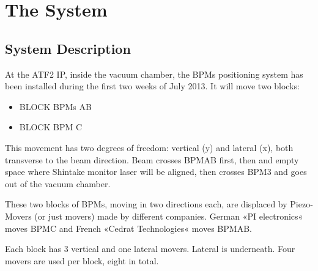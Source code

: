 \documentclass[a4paper,11pt]{book}
\begin{document}
\chapter{The System}
\section{System Description}
At the ATF2 IP, inside the vacuum chamber, the BPMs positioning system has been installed during the first two weeks of July 2013.
It will move two blocks:
\begin{itemize}
\item BLOCK BPMs AB
\item BLOCK BPM C
\end{itemize}
This movement has two degrees of freedom: vertical (y) and lateral (x), both transverse to the beam direction. Beam crosses BPMAB first, then and empty space where Shintake monitor laser will be aligned, then crosses BPM3 and goes out of the vacuum chamber.

These two blocks of BPMs, moving in two directions each, are displaced by Piezo-Movers (or just movers) made by different companies. German «PI electronics« moves  BPMC and French «Cedrat Technologies« moves BPMAB.

Each block has 3 vertical and one lateral movers. Lateral is underneath. Four movers are used per block, eight in total.
\end{document}
